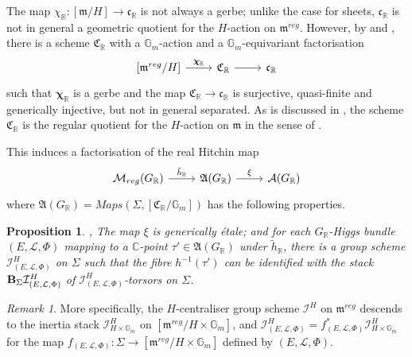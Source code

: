 \documentclass{amsart}
\newtheorem{proposition}[theorem]{Proposition}
\theoremstyle{remark}
\newtheorem{remark}[theorem]{Remark}
\numberwithin{theorem}{section}
\numberwithin{equation}{section}
\begin{document}
The map $\chi_\mathbb{R}:[\mathfrak{m}/H] \rightarrow \mathfrak{c}_\mathbb{R}$ is not always a gerbe; unlike the case for sheets, $\mathfrak{c}_\mathbb{R}$ is not in general a geometric quotient for the $H$-action on $\mathfrak{m}^{reg}$. However, by \cite[Section 4.2]{GPPN} and \cite[Theorem 3.16]{HM}, there is a scheme $\mathfrak{C}_{\mathbb{R}}$ with a $\mathbb{G}_m$-action and a $\mathbb{G}_m$-equivariant factorisation
\begin{equation}\label{RealChevGerbeeqn}
\begin{tikzcd}
{[\mathfrak{m}^{reg}/H]} \arrow[r, "{\boldsymbol{ \chi}}_{\mathbb{R}}"] & {\mathfrak{C}_{\mathbb{R}}} \arrow[r] & {\mathfrak{c}_\mathbb{R}}
\end{tikzcd}
\end{equation}
such that $\boldsymbol{\chi}_{\mathbb{R}}$ is a gerbe and the map $\mathfrak{C}_{\mathbb{R}} \rightarrow \mathfrak{c}_\mathbb{R}$ is surjective, quasi-finite and generically injective, but not in general separated. As is discussed in \cite[Section 3]{HM}, the scheme $\mathfrak{C}_\mathbb{R}$ is the regular quotient for the $H$-action on $\mathfrak{m}$ in the sense of \cite[Section 4.2]{Ngo3}.

This induces a factorisation of the real Hitchin map
\begin{equation}\label{RealHitchinGerbeeqn}
\begin{tikzcd}
{\mathcal M_{reg}(G_{\mathbb{R}})} \arrow[r, " \tilde{h}_{\mathbb{R}}"] & {\mathfrak{A}(G_{\mathbb{R}})} \arrow[r, "\xi"] & {\mathcal A(G_{\mathbb{R}})}
\end{tikzcd}
\end{equation}
 where $ \mathfrak{A}(G_\mathbb{R}) = Maps(\Sigma,[\mathfrak{C}_{\mathbb{R}}/\mathbb{G}_m])$ has the following properties.

\begin{proposition}\label{RealHitchinGerbeprp}\cite[Section 4.2]{GPPN}, \cite[Theorems 5.2 and 5.3]{HM}
    The map $\xi$ is generically \'{e}tale; and for each $G_{\mathbb{R}}$-Higgs bundle $(E,\mathcal L,\Phi)$ mapping to a $\mathbb{C}$-point $\tau' \in  \mathfrak{A}(G_{\mathbb{R}})$ under ${\tilde{h}}_{\mathbb{R}}$, there is a group scheme $\mathcal I^H_{(E,\mathcal L, \Phi)}$ on $\Sigma$ such that the fibre $h^{-1}(\tau')$ can be identified with the stack ${\bf B}_{\Sigma} \mathcal I_{(E,\mathcal L,\Phi)}^H$ of $\mathcal I_{(E,\mathcal L, \Phi)}^H$-torsors on $\Sigma$.
\end{proposition}

\begin{remark}\label{RealHitchinGerbermk}
    More specifically, the $H$-centraliser group scheme $\mathcal I^H$ on $\mathfrak{m}^{reg}$ descends to the inertia stack $\mathcal I^H_{H\times \mathbb{G}_m}$ on $[\mathfrak{m}^{reg}/H\times \mathbb{G}_m]$, and $\mathcal I_{(E,\mathcal L,\Phi)}^H = f_{(E,\mathcal L,\Phi)}^*\mathcal I^H_{H\times \mathbb{G}_m}$ for the map $f_{(E,\mathcal L,\Phi)}:\Sigma \rightarrow [\mathfrak{m}^{reg}/H \times \mathbb{G}_m]$ defined by $(E,\mathcal L, \Phi)$.
\end{remark}
\end{document}
